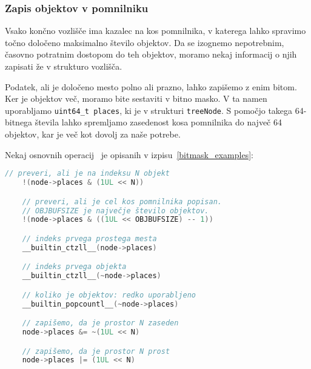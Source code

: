 \documentclass[a4paper,12pt]{article}
\begin{document}
\subsubsection{Zapis objektov v pomnilniku}
Vsako končno vozlišče ima kazalec na kos pomnilnika, v katerega lahko spravimo
točno določeno maksimalno število objektov. Da se izognemo nepotrebnim, časovno potratnim dostopom
do teh objektov, moramo nekaj informacij o njih zapisati že v strukturo vozlišča.

Podatek, ali je določeno mesto polno ali prazno, lahko zapišemo z enim bitom. Ker je objektov več,
moramo bite sestaviti v bitno masko. V ta namen uporabljamo \lstinline|uint64_t places|, ki je v strukturi 
\lstinline|treeNode|. S pomočjo takega 64-bitnega števila lahko spremljamo zasedenost kosa pomnilnika 
do največ 64 objektov, kar je več kot dovolj za naše potrebe. 

Nekaj osnovnih operacij~\cite{gcc_documentation} je opisanih v izpisu~\ref{bitmask_examples}:
\begin{lstlisting}[caption={Uporaba bitne maske za objekte}, label=bitmask_examples, language=C]
    // preveri, ali je na indeksu N objekt
    !(node->places & (1UL << N))

    // preveri, ali je cel kos pomnilnika popisan.
    // OBJBUFSIZE je največje število objektov.
    !(node->places & ((1UL << OBJBUFSIZE) -- 1)) 

    // indeks prvega prostega mesta
    __builtin_ctzll__(node->places)

    // indeks prvega objekta
    __builtin_ctzll__(~node->places)

    // koliko je objektov: redko uporabljeno
    __builtin_popcountl__(~node->places)

    // zapišemo, da je prostor N zaseden
    node->places &= ~(1UL << N)

    // zapišemo, da je prostor N prost
    node->places |= (1UL << N)

\end{lstlisting}
\end{document}
